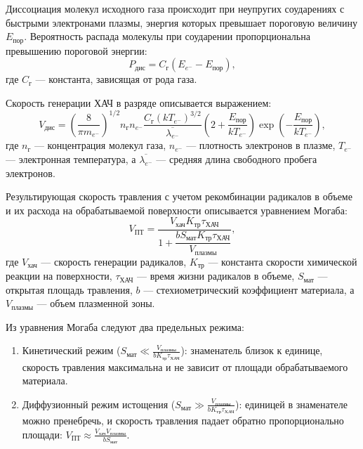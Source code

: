 \documentclass[12pt,a4paper]{article}
\theoremstyle{plain}
\theoremstyle{definition}
\theoremstyle{remark}
\numberwithin{equation}{section}
\begin{document}
Диссоциация молекул исходного газа происходит при неупругих соударениях с быстрыми электронами плазмы, энергия которых превышает пороговую величину $E_\text{пор}$. Вероятность распада молекулы при соударении пропорциональна превышению пороговой энергии:
\begin{equation*}
  P_\text{дис} = C_\text{г}(E_{e^-} - E_\text{пор}),
\end{equation*}
где $C_\text{г}$ --- константа, зависящая от рода газа.

Скорость генерации ХАЧ в разряде описывается выражением:
\begin{equation*}
  V_\text{дис} = \left(\frac{8}{\pi m_{e^-}}\right)^{1/2} n_\text{г} n_{e^-} \frac{C_\text{г}(kT_{e^-})^{3/2}}{\overline{\lambda_{e^-}}} \left(2 + \frac{E_\text{пор}}{kT_{e^-}}\right)\exp{\left(-\frac{E_\text{пор}}{kT_{e^-}}\right)},
\end{equation*}
где $n_\text{г}$ --- концентрация молекул газа, $n_{e^-}$ --- плотность электронов в плазме, $T_{e^-}$ --- электронная температура, а $\overline{\lambda_{e^-}}$ --- средняя длина свободного пробега электронов.

Результирующая скорость травления с учетом рекомбинации радикалов в объеме и их расхода на обрабатываемой поверхности описывается уравнением Могаба:
\begin{equation*}
  V_\text{ПТ} = \frac{V_\text{хач} K_\text{тр} \tau_\text{ХАЧ}}{1 + \dfrac{b S_\text{мат} K_\text{тр} \tau_\text{ХАЧ}}{V_\text{плазмы}}},
\end{equation*}
где $V_\text{хач}$ --- скорость генерации радикалов, $K_\text{тр}$ --- константа скорости химической реакции на поверхности, $\tau_\text{ХАЧ}$ --- время жизни радикалов в объеме, $S_\text{мат}$ --- открытая площадь травления, $b$ --- стехиометрический коэффициент материала, а $V_\text{плазмы}$ --- объем плазменной зоны.

Из уравнения Могаба следуют два предельных режима:
\begin{enumerate}
  \item Кинетический режим ($S_\text{мат} \ll \frac{V_\text{плазмы}}{b K_\text{тр} \tau_\text{ХАЧ}}$): знаменатель близок к единице, скорость травления максимальна и не зависит от площади обрабатываемого материала.
  \item Диффузионный режим истощения ($S_\text{мат} \gg \frac{V_\text{плазмы}}{b K_\text{тр} \tau_\text{ХАЧ}}$): единицей в знаменателе можно пренебречь, и скорость травления падает обратно пропорционально площади: $V_\text{ПТ} \approx \frac{V_\text{хач} V_\text{плазмы}}{b S_\text{мат}}$.
\end{enumerate}
\end{document}

